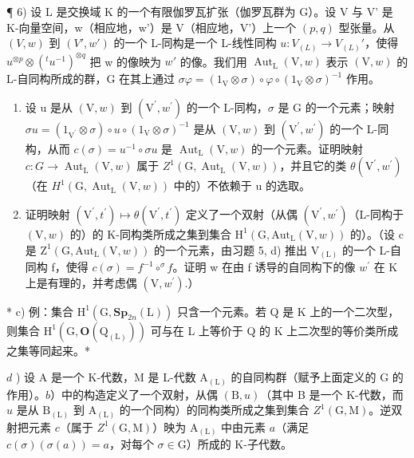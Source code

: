 ¶ 6) 设 L 是交换域 K 的一个有限伽罗瓦扩张（伽罗瓦群为 G）。设 V 与 V' 是 K-向量空间，w（相应地，w'）是 V（相应地，V'）上一个 \((p,q)\) 型张量。从 \((V,w)\) 到 \((V',w')\) 的一个 L-同构是一个 L-线性同构 \(u:V_{(L)}\to V_{(L)}'\)，使得 \(u^{\otimes p}\otimes(^{t}u^{-1})^{\otimes q}\) 把 w 的像映为 \(w'\) 的像。我们用 \(\operatorname{Aut}_{\mathrm{L}}(\mathrm{V},w)\) 表示 \((\mathrm{V},w)\) 的 L-自同构所成的群，G 在其上通过 \(\sigma\varphi=(1_{\mathrm{V}}\otimes\sigma)\circ\varphi\circ(1_{\mathrm{V}}\otimes\sigma)^{-1}\) 作用。

\begin{enumerate}
\def\labelenumi{\alph{enumi})}
\item
  设 u 是从 \((\mathrm{V}, w)\) 到 \((\mathrm{V}^{\prime}, w^{\prime})\) 的一个 L-同构，\(\sigma\) 是 G 的一个元素；映射 \(\sigma u = (1_{\mathrm{V}^{\prime}} \otimes \sigma) \circ u \circ (1_{\mathrm{V}} \otimes \sigma)^{-1}\) 是从 \((\mathrm{V}, w)\) 到 \((\mathrm{V}^{\prime}, w^{\prime})\) 的一个 L-同构，从而 \(c(\sigma) = u^{-1} \circ \sigma u\) 是 \(\operatorname{Aut}_{\mathrm{L}}(\mathrm{V}, w)\) 的一个元素。证明映射 \(c : G \to \operatorname{Aut}_{\mathrm{L}}(\mathrm{V}, w)\) 属于 \(Z^{1}(\mathrm{G}, \operatorname{Aut}_{\mathrm{L}}(\mathrm{V}, w))\)，并且它的类 \(\theta(\mathrm{V}^{\prime}, w^{\prime})\)（在 \(H^{1}(\mathrm{G}, \operatorname{Aut}_{\mathrm{L}}(\mathrm{V}, w))\) 中的）不依赖于 u 的选取。
\item
  证明映射 \((\mathrm{V}^{\prime},t^{\prime})\mapsto\theta(\mathrm{V}^{\prime},t^{\prime})\) 定义了一个双射（从偶 \((\mathrm{V}^{\prime},w^{\prime})\)（L-同构于 \((\mathrm{V},w)\) 的）的 K-同构类所成之集到集合 \(\mathrm{H}^{1}(\mathrm{G},\mathrm{Aut}_{\mathrm{L}}(\mathrm{V},w))\) 的）。（设 c 是 \(\mathrm{Z}^{1}(\mathrm{G},\mathrm{Aut}_{\mathrm{L}}(\mathrm{V},w))\) 的一个元素，由习题 5, d) 推出 \(\mathrm{V}_{(\mathrm{L})}\) 的一个 L-自同构 f，使得 \(c(\sigma)=f^{-1}\circ^{\sigma}f\)。证明 w 在由 f 诱导的自同构下的像 \(w^{\prime}\) 在 K 上是有理的，并考虑偶 \((\mathrm{V},w^{\prime}).\)）
\end{enumerate}

* c) 例：集合 \(\mathrm{H}^1 (\mathrm{G},\mathbf{Sp}_{2n}(\mathrm{L}))\) 只含一个元素。若 Q 是 K 上的一个二次型，则集合 \(\mathrm{H}^1 (\mathrm{G},\mathbf{O}(\mathrm{Q}_{(\mathrm{L})}))\) 可与在 L 上等价于 Q 的 K 上二次型的等价类所成之集等同起来。*

\(d\) ) 设 A 是一个 K-代数，M 是 L-代数 \(\mathrm{A}_{(\mathrm{L})}\) 的自同构群（赋予上面定义的 G 的作用）。\(b\)）中的构造定义了一个双射，从偶 \((\mathrm{B},u)\)（其中 B 是一个 K-代数，而 \(u\) 是从 \(\mathrm{B}_{(\mathrm{L})}\) 到 \(\mathrm{A}_{(\mathrm{L})}\) 的一个同构）的同构类所成之集到集合 \(Z^{1}(\mathrm{G},\mathrm{M})\)。逆双射把元素 \(c\)（属于 \(Z^{1}(\mathrm{G},\mathrm{M})\)）映为 \(\mathrm{A}_{(\mathrm{L})}\) 中由元素 \(a\)（满足 \(c(\sigma)(\sigma(a)) = a\)，对每个 \(\sigma \in \mathrm{G}\)）所成的 K-子代数。

